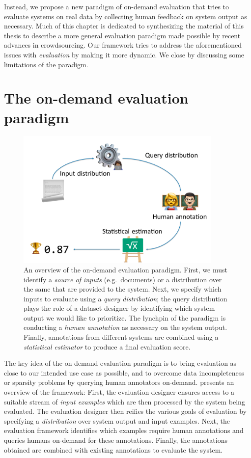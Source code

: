 Instead, we propose a new paradigm of on-demand evaluation that tries to evaluate systems on real data by collecting human feedback on system output as necessary.
Much of this chapter is dedicated to synthesizing the material of this thesis to describe a more general evaluation paradigm made possible by recent advances in crowdsourcing.
Our framework tries to address the aforementioned issues with \textit{evaluation} by making it more dynamic.
We close by discussing some limitations of the paradigm.

\section{The on-demand evaluation paradigm}

\begin{figure}
  \centering
  \includegraphics[width=0.9\textwidth]{figures/overview}
  \caption[Overview of the on-demand evaluation paradigm]{\label{fig:conclusion:overview}
  An overview of the on-demand evaluation paradigm. 
  First, we must identify a \textit{source of inputs} (e.g.\ documents) or a distribution over the same that are provided to the system.
  Next, we specify which inputs to evaluate using a \textit{query distribution}; the query distribution plays the role of a dataset designer by identifying which system output we would like to prioritize.
  The lynchpin of the paradigm is conducting a \textit{human annotation} as necessary on the system output. 
  Finally, annotations from different systems are combined using a \textit{statistical estimator} to produce a final evaluation score.
  }
\end{figure}

The key idea of the on-demand evaluation paradigm is to bring evaluation as close to our intended use case as possible, and to overcome data incompleteness or sparsity problems by querying human annotators on-demand.
 presents an overview of the framework: 
First, the evaluation designer ensures access to a suitable stream of \textit{input examples}
which are then processed by the system being evaluated.
The evaluation designer then reifies the various goals of evaluation by specifying a \textit{distribution} over system output and input examples.
Next, the evaluation framework identifies which examples require human annotations and queries humans on-demand for these annotations. 
Finally, the annotations obtained are combined with existing annotations to evaluate the system.

